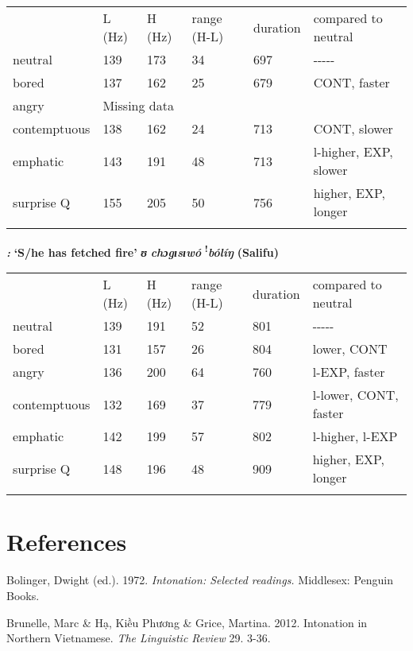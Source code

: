 \documentclass[output=paper]{langsci/langscibook}
\begin{document}
\begin{tabular}{llllll} & L (Hz) & H (Hz) & range (H-L) & duration & compared to neutral\\
\lsptoprule
neutral & 139 & 173 & 34 & 697 & {}-{}-{}-{}-{}-\\
bored & 137 & 162 & 25 & 679 & CONT, faster\\
angry & \multicolumn{5}{l}{ Missing data}\\
contemptuous & 138 & 162 & 24 & 713 & CONT, slower\\
emphatic & 143 & 191 & 48 & 713 & l-higher, EXP, slower\\
surprise Q & 155 & 205 & 50 & 756 & higher, EXP, longer\\
\lspbottomrule
\end{tabular}
\emph{\textbf{\textup{:}}}\textbf{  ‘S}\textbf{/he has fetched fire’  }\emph{\textbf{ʊ}}\emph{\textbf{ chɔgɪsɪ}}\emph{\textbf{wó}}\emph{\textbf{ }}\textbf{\textsuperscript{!}}\emph{\textbf{bólíŋ}}\textbf{  (Salifu)}

\begin{tabular}{llllll} & L (Hz) & H (Hz) & range (H-L) & duration & compared to neutral\\
\lsptoprule
neutral & 139 & 191 & 52 & 801 & {}-{}-{}-{}-{}-\\
bored & 131 & 157 & 26 & 804 & lower, CONT\\
angry & 136 & 200 & 64 & 760 & l-EXP, faster\\
contemptuous & 132 & 169 & 37 & 779 & l-lower, CONT, faster\\
emphatic & 142 & 199 & 57 & 802 & l-higher, l-EXP\\
surprise Q & 148 & 196 & 48 & 909 & higher, EXP, longer\\
\lspbottomrule
\end{tabular}
\section{References}
\begin{styleBibliographyiv}
Bolinger, Dwight (ed.). 1972. \textit{Intonation: Selected readings. }Middlesex: Penguin Books.
\end{styleBibliographyiv}

\begin{styleBibliographyiv}
Brunelle, Marc \& Hạ, Kiều Phương \& Grice, Martina. 2012. Intonation in Northern Vietnamese. \textit{The Linguistic Review} 29. 3-36. 
\end{styleBibliographyiv}
\end{document}
